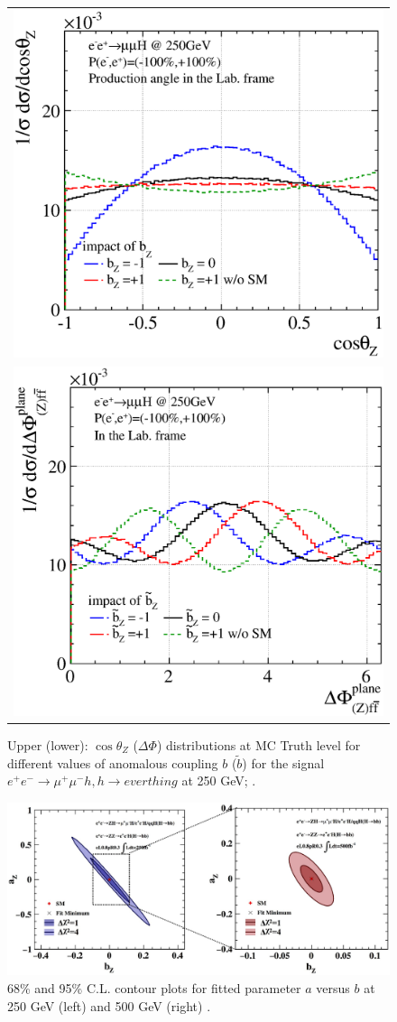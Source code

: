 \begin{figure}
\begin{tabular}[c]{c}
\includegraphics[width=0.85\hsize]{chapters/figures/ZH_anomHVV250_b.eps} \\
\includegraphics[width=0.85\hsize]{chapters/figures/ZH_anomHVV250_bt.eps} 
\end{tabular}
  \caption{Upper (lower): $\cos\theta_Z$ ($\Delta\Phi$) distributions at MC Truth level for different 
  values of anomalous coupling $b$ ($\tilde{b}$) 
  for the signal $e^+e^-\to \mu^+\mu^- h, h\to everthing$ at 250 GeV;
  \cite{Ogawa:2017bmg}.}
  \label{fig:ZHanomHVV1}
\end{figure}

\begin{figure}
\begin{center}
\includegraphics[width=0.85\hsize]{chapters/figures/ZH_anomHVV_ab.eps}
\end{center}
  \caption{68\% and 95\% C.L. contour plots for fitted parameter $a$ versus $b$ at 250 GeV (left)
  and 500 GeV (right) \cite{anomHVV}.}
  \label{fig:ZHanomHVV2}
\end{figure}
